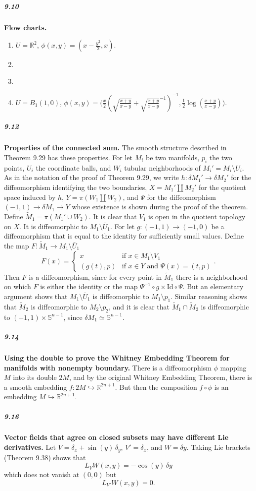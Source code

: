 \documentclass[10pt,letter]{article}
\begin{document}
\subparagraph{9.10} {\bf Flow charts.} 
\begin{enumerate}[label=(\alph*)]
\item $U = \mathbb{R}^2$, $\phi(x,y) = (x-\frac{y^2}{2},x)$. 
\item \-\
\item \-\ 
\item $U = B_1(1,0)$, $\phi(x,y) = \bigg( \frac{x}{2}(\sqrt{\frac{x+y}{x-y}}+\sqrt{\frac{x+y}{x-y}}^{-1})^{-1},\frac{1}{2}\log(\frac{x+y}{x-y}) \bigg)$.
\end{enumerate}

\subparagraph{9.12} {\bf Properties of the connected sum.} The smooth structure described in Theorem 9.29 has these properties. For let $M_i$ be two manifolds, $p_i$ the two points, $U_i$ the coordinate balls, and $W_i$ tubular neighborhoods of $M_i' = M_i \setminus U_i$. As in the notation of the proof of Theorem 9.29, we write $h: \delta M_1' \rightarrow \delta M_2'$ for the diffeomorphism identifying the two boundaries, $X = M_1' \coprod M_2'$ for the quotient space induced by $h$, $Y = \pi(W_1 \coprod W_2)$, and $\Psi$ for the diffeomorphism $(-1,1) \rightarrow \delta M_1 \rightarrow Y$ whose existence is shown during the proof of the theorem. Define $\tilde{M}_1 = \pi(M_1' \cup W_2)$. It is clear that $V_1$ is open in the quotient topology on $X$. It is diffeomorphic to $M_1 \setminus \bar{U}_1$. For let $g: (-1,1) \rightarrow (-1,0)$ be a diffeomorphism that is equal to the identity for sufficiently small values. Define the map $F: \tilde{M}_1 \rightarrow M_1 \setminus \bar{U}_1$ \[ F(x) = \begin{cases} x & \text{if } x \in M_1 \setminus V_1 \\ (g(t),p) & \text{if } x \in Y \text{ and } \Psi(x) = (t,p)\end{cases}. \] 
Then $F$ is a diffeomorphism, since for every point in $\tilde{M}_1$ there is a neighborhood on which $F$ is either the identity or the map $\Psi^{-1} \circ g \times \text{Id} \circ \Psi$. But an elementary argument shows that $M_1 \setminus \bar{U}_1$ is diffeomorphic to $M_1 \setminus p_1$. Similar reasoning shows that $\tilde{M}_2$ is diffeomorphic to $M_2 \setminus p_2$, and it is clear that $\tilde{M}_1 \cap \tilde{M}_2$ is diffeomorphic to $(-1,1) \times \mathbb{S}^{n-1}$, since $\delta M_1 \simeq \mathbb{S}^{n-1}$. 

\subparagraph{9.14} {\bf Using the double to prove the Whitney Embedding Theorem for manifolds with nonempty boundary.} There is a diffeomorphism $\phi$ mapping $M$ into its double $2M$, and by the original Whitney Embedding Theorem, there is a smooth embedding $f: 2M \hookrightarrow \mathbb{R}^{2n+1}$. But then the composition $f \circ \phi$ is an embedding $M \hookrightarrow \mathbb{R}^{2n+1}$. 

\subparagraph{9.16} {\bf Vector fields that agree on closed subsets may have different Lie derivatives.} Let $V = \delta_x + \sin(y) \, \delta_y$, $V' = \delta_x$, and $W = \delta y$. Taking Lie brackets (Theorem 9.38) shows that \[ L_VW(x,y) = - \cos(y) \, \delta y \] which does not vanish at $(0,0)$  but \[ L_{V'}W(x,y) = 0. \]
\end{document}
